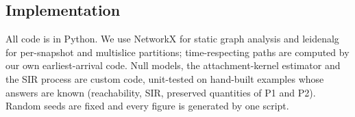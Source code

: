 \subsection{Implementation}
All code is in Python. We use NetworkX for static graph analysis and leidenalg
\citep{traag2019louvain} for per-snapshot and multislice partitions; time-respecting
paths are computed by our own earliest-arrival code. Null models, the attachment-kernel
estimator and the SIR process are custom code, unit-tested on hand-built examples
whose answers are known (reachability, SIR, preserved quantities of P1 and P2). Random
seeds are fixed and every figure is generated by one script.
